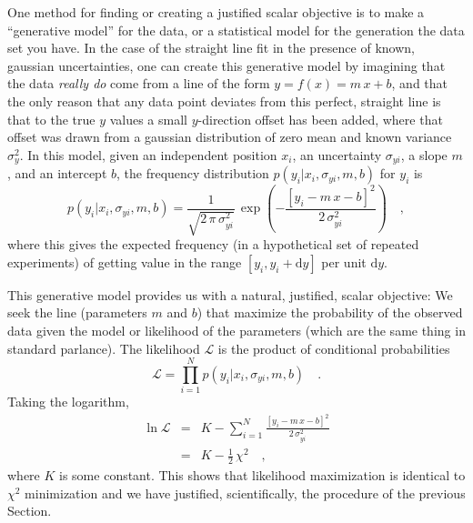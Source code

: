 \documentclass[12pt,twoside]{article}
\newcommand{\sectionname}{Section}
\renewcommand{\d}{\mathrm{d}}
\newcommand{\like}{\mathscr{L}}
\begin{document}
One method for finding or creating a justified scalar objective is to
make a ``generative model'' for the data, or a statistical model for
the generation the data set you have.  In the case of the straight
line fit in the presence of known, gaussian uncertainties, one can
create this generative model by imagining that the data \emph{really
  do} come from a line of the form $y = f(x) = m\,x+b$, and that the
only reason that any data point deviates from this perfect, straight
line is that to the true $y$ values a small $y$-direction offset has
been added, where that offset was drawn from a gaussian distribution
of zero mean and known variance $\sigma_y^2$.  In this model, given an
independent position $x_i$, an uncertainty $\sigma_{yi}$, a slope $m$,
and an intercept $b$, the frequency distribution
$p(y_i|x_i,\sigma_{yi},m,b)$ for $y_i$ is
\begin{equation}\label{eq:objectivei}
p(y_i|x_i,\sigma_{yi},m,b) = \frac{1}{\sqrt{2\,\pi\,\sigma_{yi}^2}}
 \,\exp\left(-\frac{[y_i - m\,x - b]^2}{2\,\sigma_{yi}^2}\right) \quad ,
\end{equation}
where this gives the expected frequency (in a hypothetical set of
repeated experiments) of getting value in the range $[y_i,y_i+\d y]$
per unit $\d y$.

This generative model provides us with a natural, justified, scalar
objective: We seek the line (parameters $m$ and $b$) that maximize the
probability of the observed data given the model or likelihood of the
parameters (which are the same thing in standard parlance).  The
likelihood $\like$ is the product of conditional probabilities
\begin{equation}\label{eq:like}
\like = \prod_{i=1}^N p(y_i|x_i,\sigma_{yi},m,b) \quad .
\end{equation}
Taking the logarithm,
\begin{eqnarray}\displaystyle
\ln\like
 & = & K - \sum_{i=1}^N \frac{[y_i - m\,x - b]^2}{2\,\sigma_{yi}^2} \nonumber\\
 & = & K - \frac{1}{2}\,\chi^2 \quad ,
\end{eqnarray}
where $K$ is some constant.  This shows that likelihood maximization
is identical to $\chi^2$ minimization and we have justified,
scientifically, the procedure of the previous \sectionname.
\end{document}
